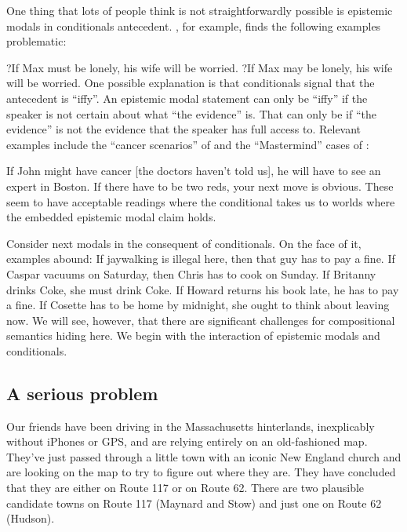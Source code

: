 One thing that lots of people think is not straightforwardly possible is
epistemic modals in conditionals antecedent. \cite{papafragou-2006-epistemic},
for example, finds the following examples problematic:

\pex
\a ?If Max must be lonely, his wife will be worried.
\a ?If Max may be lonely, his wife will be worried.
\xe
%
%
One possible explanation is that conditionals signal that the antecedent is
``iffy''. An epistemic modal statement can only be ``iffy'' if the speaker is
not certain about what ``the evidence'' is. That can only be if ``the evidence''
is not the evidence that the speaker has full access to. Relevant examples
include the ``cancer scenarios'' of \cite{derose-1991-epistemic} and the
``Mastermind'' cases of
\cite{fintel-gillies-2007-OpinionatedGuideEpistemicModality,fintel-gillies-2011-MightMadeRight}:
%

\pex
\a If John might have cancer [the doctors haven’t told us], he will have to see
an expert in Boston.
\a If there have to be two reds, your next move is obvious.
\xe
%
These seem to have acceptable readings where the conditional takes us to worlds
where the embedded epistemic modal claim holds.

Consider next modals in the consequent of conditionals. On the face of it,
examples abound:
%
%
\pex
\a If jaywalking is illegal here, then that guy has to pay a fine.
\a If Caspar vacuums on Saturday, then Chris has to cook on Sunday.
\a If Britanny drinks Coke, she must drink Coke.
\a If Howard returns his book late, he has to pay a fine.
\a If Cosette has to be home by midnight, she ought to think about leaving
now.
\xe
%
We will see, however, that there are significant challenges for compositional
semantics hiding here. We begin with the interaction of epistemic modals and
conditionals. 

\clearpage
\subsection{A serious problem}
\label{subsec:problem}

%
Our friends have been driving in the Massachusetts hinterlands, inexplicably
without iPhones or GPS, and are relying entirely on an old-fashioned map.
They've just passed through a little town with an iconic New England church and
are looking on the map to try to figure out where they are. They have concluded
that they are either on Route 117 or on Route 62. There are two plausible
candidate towns on Route 117 (Maynard and Stow) and just one on Route 62
(Hudson).

